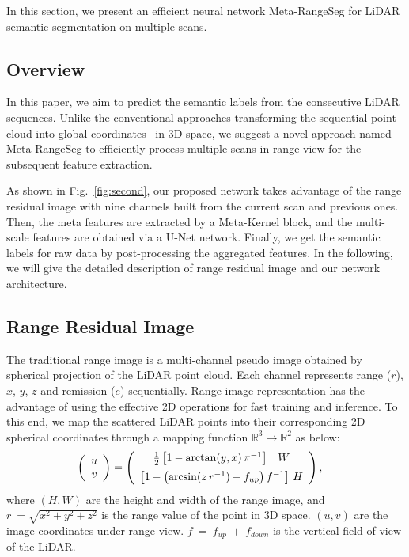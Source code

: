 \documentclass[letterpaper, 10 pt, journal, twoside]{ieeetran}
\begin{document}
\label{sec:main}

In this section, we present an efficient neural network Meta-RangeSeg for LiDAR semantic segmentation on multiple scans.

\subsection{Overview}
In this paper, we aim to predict the semantic labels from the consecutive LiDAR sequences. Unlike the conventional approaches transforming the sequential point cloud into global coordinates~\cite{shi2020spsequencenet, zhu2021cylindrical} in 3D space, we suggest a novel approach named Meta-RangeSeg to efficiently process multiple scans in range view for the subsequent feature extraction. 


As shown in Fig.~\ref{fig:second}, our proposed network takes advantage of the range residual image with nine channels built from the current scan and previous ones. Then, the meta features are extracted by a Meta-Kernel block, and the multi-scale features are obtained via a U-Net network. Finally, we get the semantic labels for raw data by post-processing the aggregated features. In the following, we will give the detailed description of range residual image and our network architecture.

\subsection{Range Residual Image}
The traditional range image is a multi-channel pseudo image obtained by spherical projection of the LiDAR point cloud. Each channel represents range ($r$), $x$, $y$, $z$ and remission ($e$) sequentially. Range image representation has the advantage of using the effective 2D operations for fast training and inference. To this end, we map the scattered LiDAR points into their corresponding 2D spherical coordinates through a mapping function $\mathbb{R}^3 \rightarrow \mathbb{R}^2$ as below: 
\begin{align}
	\left( \begin{array}{c} u \vspace{0.0em} \\ v \end{array}\right) & = \left(\begin{array}{cc} \frac{1}{2}\left[1-\arctan(y, x) \, \pi^{-1}\right]~\,~W   \vspace{0.5em} \\
			\left[1 - \left(\arcsin(z\, r^{-1}) +f_{up}\right) {f}^{-1}\right] \, H\end{array} \right), \label{eq:projection}
\end{align}
where $(H, W)$ are the height and width of the range image, and $r~{=}\sqrt{x^{2}+y^{2}+z^{2}}$ is the range value of the point in 3D space. $(u,v)$ are the image coordinates under range view. ${f}~{=}~{f}_{{up}}~{+}~{f}_{{down}}$ is the vertical field-of-view of the LiDAR. 
\end{document}
